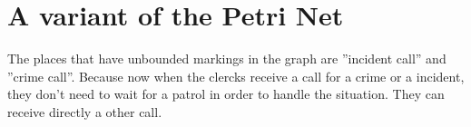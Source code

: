 \section{A variant of the Petri Net}
\label{sec:A variant of the Petri Net}
The places that have unbounded markings in the graph are ''incident call'' and ''crime call''. Because now when the clercks receive a call for a crime or a incident, they don't need  to wait for a patrol in order to handle the situation. They can receive directly a other call.
